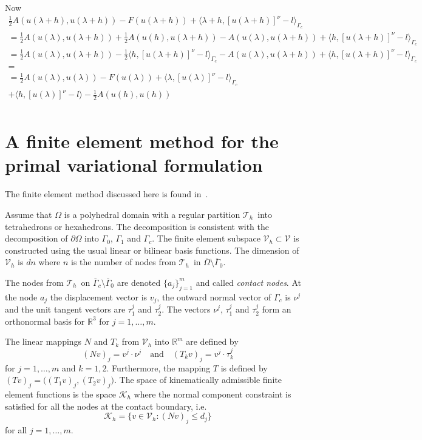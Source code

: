 \documentclass[12pt,a4paper]{article}
\numberwithin{equation}{section}
\numberwithin{table}{section}
\numberwithin{figure}{section}
\newcommand{\R}{\ensuremath{\mathbb{R}}}
\newcommand{\half}{\ensuremath{\frac{1}{2}}}
\newcommand{\dOmega}{{\partial\Omega}}
\newcommand{\V}{\ensuremath{\mathcal{V}}}
\newcommand{\K}{\ensuremath{\mathcal{K}}}
\newcommand{\Vh}{{\mathcal V}_h}
\newcommand{\Th}{\ensuremath{{\mathcal T}_h}}
\providecommand{\dualp}[2]{\langle #1, #2 \rangle}
\newcommand{\ulambda}{\ensuremath{u(\lambda)}}
\newcommand{\ulambdah}{\ensuremath{u(\lambda+h)}}
\newcommand{\ulh}{\ensuremath{u(h)}}
\begin{document}
Now
\begin{multline*}
  \half A(\ulambdah,\ulambdah) - F(\ulambdah) + \dualp{\lambda+h}{[\ulambdah]^\nu -
    l}_{\Gamma_c}  \\
  = \half A(\ulambda,\ulambdah) + \half A(\ulh, \ulambdah) - A(\ulambda, \ulambdah)
  + \dualp{h}{[\ulambdah]^\nu-l}_{\Gamma_c}  \\
  = \half A(\ulambda, \ulambdah) - \half\dualp{h}{[\ulambdah]^\nu - l}_{\Gamma_c}
  -  A(\ulambda, \ulambdah) + \dualp{h}{[\ulambdah]^\nu -
    l}_{\Gamma_c}  \\
  = \\
  =   \half A(\ulambda,\ulambda) - F(\ulambda) + \dualp{\lambda}{[\ulambda]^\nu -
    l}_{\Gamma_c} \\ + \dualp{h}{[\ulambda]^\nu-l} -\half A(\ulh,\ulh) \\
\end{multline*}





\section{A finite element method for the primal variational formulation}
\label{sec:finite-elem-meth}

The finite element method discussed here is found in~\cite{haslinger04:3dContact}.

Assume that $\Omega$ is a polyhedral domain with a regular partition \Th\ into
tetrahedrons or hexahedrons.  The decomposition is consistent with the decomposition of
$\dOmega$ into $\Gamma_0$, $\Gamma_1$ and $\Gamma_c$.  The finite element subspace
$\Vh\subset\V$ is constructed using the usual linear or bilinear basis functions.  The
dimension of $\Vh$ is $d n$ where $n$ is the number of nodes from \Th\ in
$\overline{\Omega} \setminus \overline{\Gamma}_0$.

The nodes from \Th\ on $\overline{\Gamma}_c \setminus \overline{\Gamma}_0$ are denoted
$\{a_j\}_{j=1}^{m}$ and called \emph{contact nodes}.  At the node $a_j$ the displacement
vector is $v_j$, the outward normal vector of $\Gamma_c$ is $\nu^j$ and the unit tangent
vectors are $\tau_1^j$ and $\tau_2^j$.  The vectors $\nu^j$, $\tau_1^j$ and $\tau_2^j$
form an orthonormal basis for $\R^3$ for $j=1,\dots,m$.

The linear mappings $N$ and $T_k$ from $\Vh$ into $\R^m$ are defined by
\begin{equation}
  \label{eq:11}
  (Nv)_j = v^j\cdot\nu^j\quad\text{and}\quad (T_k v)_j = v^j\cdot \tau_k^j
\end{equation}
for $j=1,\dotsc,m$ and $k=1,2$.  Furthermore, the mapping $T$ is defined by $(Tv)_j =
\bigl( (T_1 v)_j, (T_2 v)_j \bigr)$.  The space of kinematically admissible finite element
functions is the space $\K_h$ where the normal component constraint is satisfied for all
the nodes at the contact boundary, i.e.
\begin{equation}
  \label{eq:4}
  \K_h = \{ v\in\Vh \colon (N v)_j \le d_j\}
\end{equation}
for all $j=1,\dotsc,m$.
\end{document}
